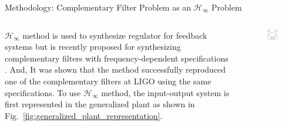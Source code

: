 \documentclass{beamer}
\begin{document}
\begin{frame}[t]
\begin{columns}[t]
\begin{column}{0.32\linewidth}
\begin{block}{Methodology: Complementary Filter Problem as an $\mathcal{H}_\infty$ Problem}
			\medskip
			
			\begin{columns}[t, onlytextwidth]
				\begin{column}{0.55\textwidth}
					$\mathcal{H}_\infty$ method is used to synthesize regulator for feedback systems but is recently proposed for synthesizing complementary filters with frequency-dependent specifications \cite{Thomas:2019}.
					And, It was shown that the method successfully reproduced one of the complementary filters at LIGO \cite{Matichard:2015} using the same specifications.
					To use $\mathcal{H}_\infty$ method, the input-output system is first represented in the generalized plant as shown in Fig.~\ref{fig:generalized_plant_representation}.
				\end{column}
				\begin{column}{0.45\textwidth}
					\begin{figure}
						\centering
						\includegraphics[width=0.5\linewidth]{generalized_plant}

\end{figure}
\end{column}
\end{columns}
\end{block}
\end{column}
\end{columns}
\end{frame}
\end{document}
